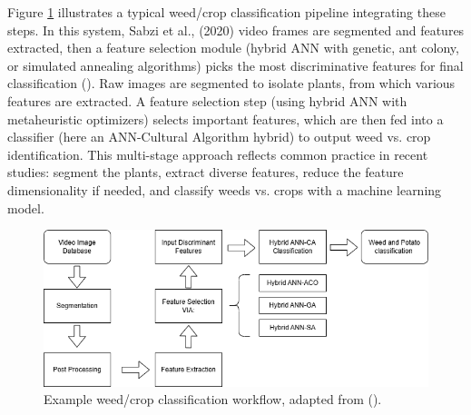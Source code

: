 \documentclass[letterpaper, notitlepage]{report}
\begin{document}
Figure \ref{fig:workflow-sabzi} illustrates a typical weed/crop classification pipeline integrating these steps. In this system, Sabzi et al., (2020)  video frames are segmented  and  features extracted, then a feature selection module (hybrid ANN with genetic, ant colony, or simulated annealing algorithms) picks the most discriminative features for final classification (\cite{Sabzi2020-af}). Raw images are segmented to isolate plants, from which various features are extracted. A feature selection step (using hybrid ANN with metaheuristic optimizers) selects important features, which are then fed into a classifier (here an ANN-Cultural Algorithm hybrid) to output weed vs. crop identification. This multi-stage approach reflects common practice in recent studies: segment the plants, extract diverse features, reduce the feature dimensionality if needed, and classify weeds vs. crops with a machine learning model.

\begin{figure}[h!]
	\centering
	\includegraphics[width=0.7\linewidth]{./figures/sabzi-workflow.png}
	\caption[Color correction target and image set identification]{Example weed/crop classification workflow, adapted from \citeauthor{Sabzi2020-af} (\citeyear{Sabzi2020-af}).}
	\label{fig:workflow-sabzi}
\end{figure}

%
\end{document}
